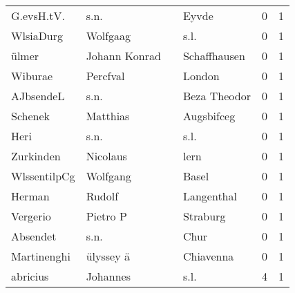 \documentclass[10pt,a4paper,landscape]{article}
\begin{document}
\begin{longtable}{llllrr}
               G.evsH.tV. &                               s.n. &             &                                       Eyvde &          0 &         1 \\
                WlsiaDurg &                           Wolfgaag &             &                                        s.l. &          0 &         1 \\
                    ülmer &                      Johann Konrad &             &                                Schaffhausen &          0 &         1 \\
                  Wiburae &                           Percfval &             &                                      London &          0 &         1 \\
                AJbsendeL &                               s.n. &             &                                Beza Theodor &          0 &         1 \\
                  Schenek &                           Matthias &             &                                  Augsbifceg &          0 &         1 \\
                     Heri &                               s.n. &             &                                        s.l. &          0 &         1 \\
                Zurkinden &                           Nicolaus &             &                                        lern &          0 &         1 \\
             WlssentilpCg &                           Wolfgang &             &                                       Basel &          0 &         1 \\
                   Herman &                             Rudolf &             &                                  Langenthal &          0 &         1 \\
                 Vergerio &                           Pietro P &             &                                    Straburg &          0 &         1 \\
                 Absendet &                               s.n. &             &                                        Chur &          0 &         1 \\
              Martinenghi &                          ülyssey ä &             &                                   Chiavenna &          0 &         1 \\
                 abricius &                           Johannes &             &                                        s.l. &          4 &         1 \\

\end{longtable}
\end{document}
